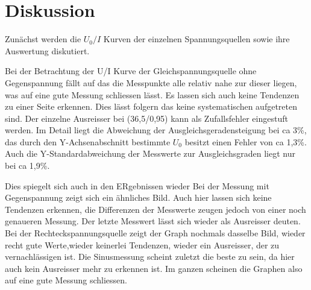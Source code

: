 \section{Diskussion}
\label{sec:Diskussion}


Zunächst werden die $U_0/I $ Kurven der einzelnen Spannungsquellen sowie ihre Auswertung diskutiert.

Bei der Betrachtung der U/I Kurve der Gleichspannungsquelle ohne Gegenspannung
fällt auf das die Messpunkte alle relativ nahe zur dieser liegen, was auf eine gute
Messung schliessen lässt. Es lassen sich auch keine
Tendenzen zu einer Seite erkennen. Dies lässt folgern das keine systematischen
aufgetreten sind. Der einzelne Ausreisser bei (36,5/0,95) kann als Zufallsfehler
eingestuft werden.
 Im Detail liegt die Abweichung der Ausgleichsgeradensteigung bei ca 3\%, das durch den
 Y-Achsenabschnitt bestimmte $U_0$ besitzt einen Fehler von ca 1,3\%. Auch
 die Y-Standardabweichung der Messwerte zur Ausgleichsgraden liegt nur bei ca 1,9\%.






Dies spiegelt sich auch in den ERgebnissen wieder Bei der Messung mit Gegenspannung zeigt sich ein ähnliches Bild.
 Auch hier lassen sich keine Tendenzen erkennen, die Differenzen der Messwerte zeugen
jedoch von einer noch genaueren Messung. Der letzte Messwert lässt sich wieder als
Ausreisser deuten. Bei der Rechteckspannungsquelle zeigt der Graph nochmals dasselbe
Bild, wieder recht gute Werte,wieder keinerlei Tendenzen, wieder ein Ausreisser, der
zu vernachlässigen ist. Die Sinusmessung scheint zuletzt die beste zu sein, da hier auch
kein Ausreisser mehr zu erkennen ist. Im ganzen scheinen die Graphen also auf eine
gute Messung schliessen.
